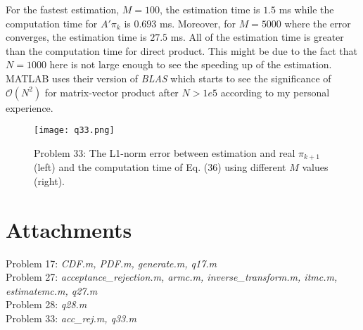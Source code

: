 \documentclass[a4paper, 11pt]{article}
\begin{document}
For the fastest estimation, $M=100$, the estimation time is $1.5$ ms while the computation time for $A'\pi_k$ is $0.693$ ms. Moreover, for $M=5000$ where the error converges, the estimation time is $27.5$ ms. All of the estimation time is greater than the computation time for direct product. This might be due to the fact that $N=1000$ here is not large enough to see the speeding up of the estimation. MATLAB uses their version of \textit{BLAS} which starts to see the significance of $\mathcal{O}(N^2)$ for matrix-vector product after $N>1e5$ according to my personal experience. 


\begin{figure}
	\begin{center}
		\texttt{[image: q33.png]}
		\caption{Problem 33: The L1-norm error between estimation and real $\pi_{k+1}$ (left) and the computation time of Eq. (36) using different $M$ values (right).  }
	\end{center}
\end{figure}


\section*{Attachments}
	Problem 17: \textit{CDF.m, PDF.m, generate.m, q17.m} \\
	Problem 27: \textit{acceptance\_rejection.m, armc.m, inverse\_transform.m, itmc.m, estimatemc.m, q27.m}\\
	Problem 28: \textit{q28.m}\\
	Problem 33: \textit{acc\_rej.m, q33.m}\\

\end{document}
